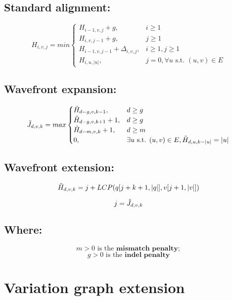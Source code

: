 \documentclass{article}
\begin{document}
\subsection{Standard alignment:}
\begin{equation}
    H_{i,v,j} = min \begin{cases}
        H_{i-1,v,j} + g, & i \ge 1 \\
        H_{i,v,j-1} + g, & j \ge 1 \\
        H_{i-1,v,j-1} + \Delta_{i,v,j}, & i\ge1, j\ge1 \\
        H_{i,u,\lvert{u}\rvert}, & j=0, \forall u \text{ s.t. } (u, v) \in E
    \end{cases}
\end{equation}

\subsection{Wavefront expansion:}
\begin{equation}
    \Tilde{J}_{d,v,k} = max \begin{cases}
        \Tilde{H}_{d-g,v,k-1}, & d \ge g\\
        \Tilde{H}_{d-g,v,k+1} + 1, & d \ge g\\
        \Tilde{H}_{d-m,v,k} + 1, & d \ge m\\
        0, & \exists u \text{ s.t. } (u, v) \in E, \Tilde{H}_{d,u,k - \lvert u \rvert} = \lvert u\rvert
    \end{cases}
\end{equation}

\subsection{Wavefront extension:}
\begin{equation}
    \Tilde{H}_{d,v,k} = j + LCP(q[j + k + 1, \lvert q \rvert], v[j + 1, \lvert v \rvert])
\end{equation}

$$j = \Tilde{J}_{d,v,k}$$

\subsection{Where:}
$$m > 0 \text{ is the } \textbf{mismatch penalty};$$
$$g > 0 \text{ is the } \textbf{indel penalty}$$

\section{Variation graph extension}
\end{document}
